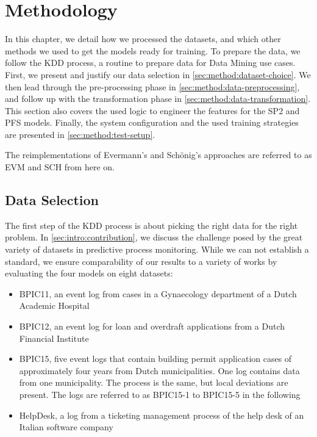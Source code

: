 \chapter{Methodology}\label{chap:methodology}
In this chapter, we detail how we processed the datasets, and which other methods we used to get the models ready for training.
To prepare the data, we follow the KDD process, a routine to prepare data for Data Mining use cases.
First, we present and justify our data selection in \autoref{sec:method:dataset-choice}.
We then lead through the pre-processing phase in \autoref{sec:method:data-preprocessing}, and follow up with the transformation phase in \autoref{sec:method:data-transformation}.
This section also covers the used logic to engineer the features for the SP2 and PFS models.
Finally, the system configuration and the used training strategies are presented in \autoref{sec:method:test-setup}.

The reimplementations of Evermann's and Schönig's approaches are referred to as EVM and SCH from here on.

\section{Data Selection}\label{sec:method:dataset-choice}
The first step of the KDD process is about picking the right data for the right problem.
In \autoref{sec:intro:contribution}, we discuss the challenge posed by the great variety of datasets in predictive process monitoring. While we can not establish a standard, we ensure comparability of our results to a variety of works by evaluating the four models on eight datasets:

\begin{itemize}
    \item BPIC11, an event log from cases in a Gynaecology department of a Dutch Academic Hospital~\cite{BPIC2011}
    \item BPIC12, an event log for loan and overdraft applications from a Dutch Financial Institute~\cite{BPIC2012}
    \item BPIC15, five event logs that contain building permit application cases of approximately four years from Dutch municipalities. One log contains data from one municipality. The process is the same, but local deviations are present. The logs are referred to as BPIC15-1 to BPIC15-5 in the following~\cite{BPIC2015}
    \item HelpDesk, a log from a ticketing management process of the help desk of an Italian software company~\cite{Helpdesk}
\end{itemize}

